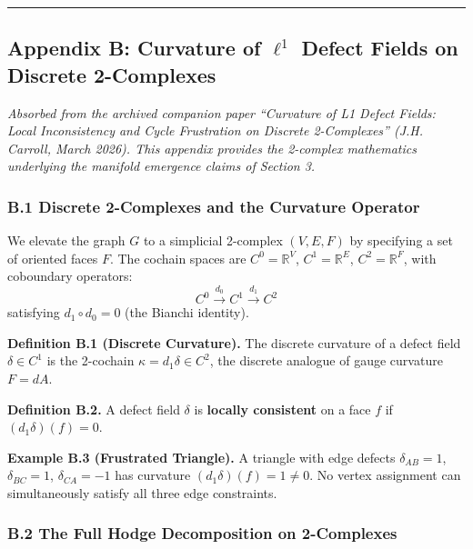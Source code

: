 \documentclass[
]{article}
\begin{document}
\begin{center}\rule{0.5\linewidth}{0.5pt}\end{center}

\subsection{\texorpdfstring{Appendix B: Curvature of \(\ell^1\) Defect
Fields on Discrete
2-Complexes}{Appendix B: Curvature of \textbackslash ell\^{}1 Defect Fields on Discrete 2-Complexes}}\label{appendix-b-curvature-of-ell1-defect-fields-on-discrete-2-complexes}

\emph{Absorbed from the archived companion paper ``Curvature of L1
Defect Fields: Local Inconsistency and Cycle Frustration on Discrete
2-Complexes'' (J.H. Carroll, March 2026). This appendix provides the
2-complex mathematics underlying the manifold emergence claims of
Section 3.}

\subsubsection{B.1 Discrete 2-Complexes and the Curvature
Operator}\label{b.1-discrete-2-complexes-and-the-curvature-operator}

We elevate the graph \(G\) to a simplicial 2-complex \((V, E, F)\) by
specifying a set of oriented faces \(F\). The cochain spaces are
\(C^0 = \mathbb{R}^V\), \(C^1 = \mathbb{R}^E\), \(C^2 = \mathbb{R}^F\),
with coboundary operators:
\[ C^0 \xrightarrow{d_0} C^1 \xrightarrow{d_1} C^2 \] satisfying
\(d_1 \circ d_0 = 0\) (the Bianchi identity).

\textbf{Definition B.1 (Discrete Curvature).} The discrete curvature of
a defect field \(\delta \in C^1\) is the 2-cochain
\(\kappa = d_1 \delta \in C^2\), the discrete analogue of gauge
curvature \(F = dA\).

\textbf{Definition B.2.} A defect field \(\delta\) is \textbf{locally
consistent} on a face \(f\) if \((d_1 \delta)(f) = 0\).

\textbf{Example B.3 (Frustrated Triangle).} A triangle with edge defects
\(\delta_{AB} = 1\), \(\delta_{BC} = 1\), \(\delta_{CA} = -1\) has
curvature \((d_1\delta)(f) = 1 \neq 0\). No vertex assignment can
simultaneously satisfy all three edge constraints.

\subsubsection{B.2 The Full Hodge Decomposition on
2-Complexes}\label{b.2-the-full-hodge-decomposition-on-2-complexes}
\end{document}
